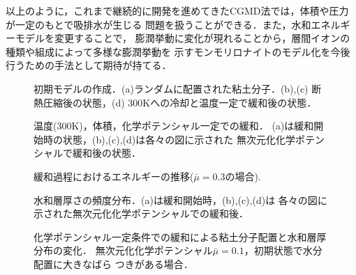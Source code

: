 以上のように，これまで継続的に開発を進めてきたCGMD法では，体積や圧力が一定のもとで吸排水が生じる
問題を扱うことができる．また，水和エネルギーモデルを変更することで，
膨潤挙動に変化が現れることから，層間イオンの種類や組成によって多様な膨潤挙動を
示すモンモリロナイトのモデル化を今後行うための手法として期待が持てる．
\begin{figure}[h]
	\begin{center}
	\end{center}
	\caption{
		初期モデルの作成．(a)ランダムに配置された粘土分子．(b),(c) 断熱圧縮後の状態，(d)
		300Kへの冷却と温度一定で緩和後の状態．
	} 
	\label{fig:fig3}
\end{figure}
\begin{figure}[h]
	\begin{center}
	\end{center}
	\caption{
		温度(300K)，体積，化学ポテンシャル一定での緩和．
		(a)は緩和開始時の状態，(b),(c),(d)は各々の図に示された
		無次元化化学ポテンシャルで緩和後の状態．
	} 
	\label{fig:fig4}
\end{figure}
\begin{figure}[h]
	\begin{center}
	\end{center}
	\caption{
		緩和過程におけるエネルギーの推移($\bar{\mu}=0.3の場合$).
	} 
	\label{fig:fig5}
\end{figure}
\begin{figure}[h]
	\begin{center}
	\end{center}
	\caption{
		水和層厚さの頻度分布．(a)は緩和開始時，(b),(c),(d)は
		各々の図に示された無次元化化学ポテンシャルでの緩和後．
	} 
	\label{fig:fig6}
\end{figure}
\begin{figure}[h]
	\begin{center}
	\end{center}
	\caption{
		化学ポテンシャル一定条件での緩和による粘土分子配置と水和層厚分布の変化．
		無次元化化学ポテンシャル$\bar{\mu}=0.1$，初期状態で水分配置に大きなばら
		つきがある場合．
	} 
	\label{fig:fig7}
\end{figure}
